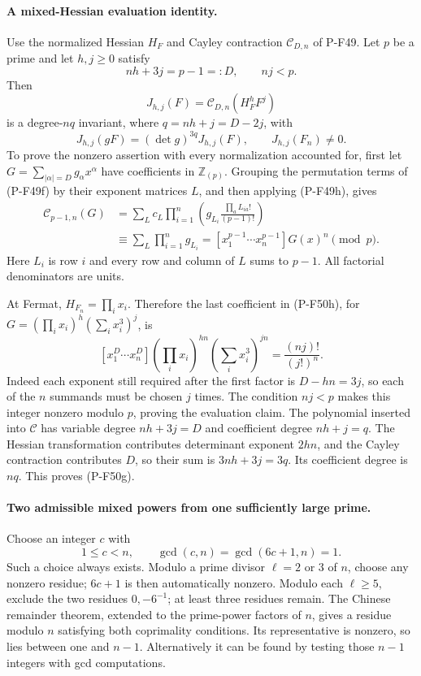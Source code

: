 \paragraph{A mixed-Hessian evaluation identity.}
Use the normalized Hessian $H_F$ and Cayley contraction
$\mathcal C_{D,n}$ of P-F49. Let $p$ be a prime and let
$h,j\ge0$ satisfy
\[
               nh+3j=p-1=:D,\qquad nj<p.
                                                        \tag{P-F50e}
\]
Then
\[
 J_{h,j}(F)=\mathcal C_{D,n}(H_F^h F^j)
                                                        \tag{P-F50f}
\]
is a degree-$nq$ invariant, where $q=nh+j=D-2j$, with
\[
       J_{h,j}(gF)=(\det g)^{3q}J_{h,j}(F),
                       \qquad J_{h,j}(F_n)\ne0.
                                                        \tag{P-F50g}
\]
To prove the nonzero assertion with every normalization
accounted for, first let $G=\sum_{|\alpha|=D}g_\alpha x^\alpha$
have coefficients in $\mathbb Z_{(p)}$. Grouping the
permutation terms of (P-F49f) by their exponent matrices
$L$, and then applying (P-F49h), gives
\[
 \begin{split}
 \mathcal C_{p-1,n}(G)
 &=\sum_L c_L\prod_{i=1}^n
             \left(g_{L_i}\frac{\prod_a L_{ia}!}{(p-1)!}\right)\\
 &\equiv\sum_L\prod_{i=1}^n g_{L_i}
   =[x_1^{p-1}\cdots x_n^{p-1}]G(x)^n\pmod p.
 \end{split}                                           \tag{P-F50h}
\]
Here $L_i$ is row $i$ and every row and column of $L$
sums to $p-1$. All factorial denominators are units.

At Fermat, $H_{F_n}=\prod_i x_i$. Therefore the last
coefficient in (P-F50h), for
$G=(\prod_i x_i)^h(\sum_i x_i^3)^j$, is
\[
 [x_1^D\cdots x_n^D]
       (\prod_i x_i)^{hn}(\sum_i x_i^3)^{jn}
                         =\frac{(nj)!}{(j!)^n}.        \tag{P-F50i}
\]
Indeed each exponent still required after the first
factor is $D-hn=3j$, so each of the $n$ summands must
be chosen $j$ times. The condition $nj<p$ makes this
integer nonzero modulo $p$, proving the evaluation claim.
The polynomial inserted into $\mathcal C$ has variable
degree $nh+3j=D$ and coefficient degree $nh+j=q$.
The Hessian transformation contributes determinant
exponent $2hn$, and the Cayley contraction contributes
$D$, so their sum is $3nh+3j=3q$. Its coefficient
degree is $nq$. This proves (P-F50g).

\paragraph{Two admissible mixed powers from one sufficiently large prime.}
Choose an integer $c$ with
\[
                1\le c<n,
       \qquad\gcd(c,n)=\gcd(6c+1,n)=1.                 \tag{P-F50j}
\]
Such a choice always exists. Modulo a prime divisor
$\ell=2$ or $3$ of $n$, choose any nonzero residue;
$6c+1$ is then automatically nonzero. Modulo each
$\ell\ge5$, exclude the two residues $0,-6^{-1}$;
at least three residues remain. The Chinese remainder
theorem, extended to the prime-power factors of $n$,
gives a residue modulo $n$ satisfying both coprimality
conditions. Its representative is nonzero, so lies
between one and $n-1$. Alternatively it can be found
by testing those $n-1$ integers with gcd computations.

